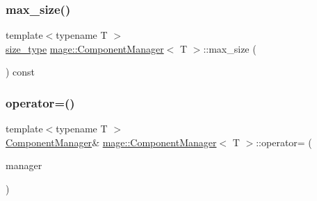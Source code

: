 \subsubsection{\texorpdfstring{max\+\_\+size()}{max\_size()}}
{\footnotesize\ttfamily template$<$typename T $>$ \\
\mbox{\hyperlink{classmage_1_1_component_manager_a6bd219525db9ec9f3adb9259e52674da}{size\+\_\+type}} \mbox{\hyperlink{classmage_1_1_component_manager}{mage\+::\+Component\+Manager}}$<$ T $>$\+::max\+\_\+size (\begin{DoxyParamCaption}{ }\end{DoxyParamCaption}) const\hspace{0.3cm}{\ttfamily [noexcept]}}

\mbox{\label{classmage_1_1_component_manager_a0ee8c4a8ff585ab544010010542d077c}} 
\subsubsection{\texorpdfstring{operator=()}{operator=()}\hspace{0.1cm}{\footnotesize\ttfamily [1/2]}}
{\footnotesize\ttfamily template$<$typename T $>$ \\
\mbox{\hyperlink{classmage_1_1_component_manager}{Component\+Manager}}\& \mbox{\hyperlink{classmage_1_1_component_manager}{mage\+::\+Component\+Manager}}$<$ T $>$\+::operator= (\begin{DoxyParamCaption}\item[{const \mbox{\hyperlink{classmage_1_1_component_manager}{Component\+Manager}}$<$ T $>$ \&}]{manager }\end{DoxyParamCaption})\hspace{0.3cm}{\ttfamily [default]}}

\mbox{\label{classmage_1_1_component_manager_a10c869ad1b3436fe1cac7d4dafc761e7}} 
